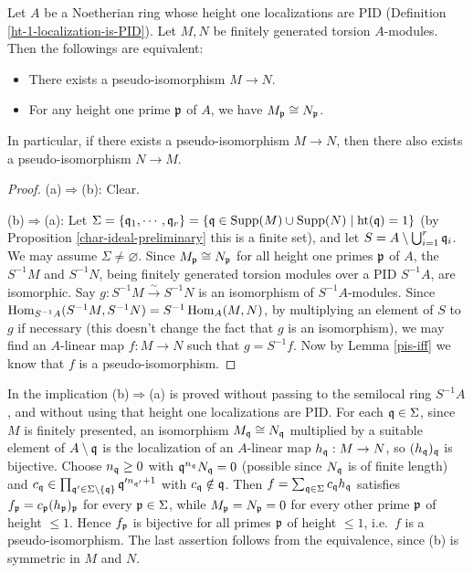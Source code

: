 \begin{prop}
\label{pis-symm}
\leanok
Let $A$ be a Noetherian ring whose height one localizations are PID
(Definition \ref{ht-1-localization-is-PID}).
Let $M,N$ be finitely generated torsion $A$-modules.
Then the followings are equivalent:
\begin{itemize}
\item[(a)]
There exists a pseudo-isomorphism $M\to N$.
\item[(b)]
For any height one prime ${\mathfrak{p}}$ of $A$, we have $M_{\mathfrak{p}}\cong N_{\mathfrak{p}}$.
\end{itemize}
In particular, if there exists a pseudo-isomorphism $M\to N$,
then there also exists a pseudo-isomorphism $N\to M$.
\end{prop}

\begin{proof}
\leanok
(a)$\Rightarrow$(b): Clear.

(b)$\Rightarrow$(a): Let $\Sigma=\{{\mathfrak{q}}_1,\cdots,{\mathfrak{q}}_r\}
=\{{\mathfrak{q}}\in{\mathrm{Supp}}(M)\cup{\mathrm{Supp}}(N)\mid{\mathrm{ht}}({\mathfrak{q}})=1\}$
(by Proposition \ref{char-ideal-preliminary} this is a finite set),
and let $S=A\setminus\bigcup_{i=1}^r{\mathfrak{q}}_i$.
We may assume $\Sigma\neq\varnothing$.
Since $M_{\mathfrak{p}}\cong N_{\mathfrak{p}}$ for all height one primes ${\mathfrak{p}}$ of $A$,
the $S^{-1}M$ and $S^{-1}N$, being finitely generated torsion modules over
a PID $S^{-1}A$, are isomorphic. Say $g:S^{-1}M\xrightarrow\sim S^{-1}N$
is an isomorphism of $S^{-1}A$-modules.
Since $\operatorname{Hom}_{S^{-1}A}(S^{-1}M,S^{-1}N)=S^{-1}\operatorname{Hom}_A(M,N)$,
by multiplying an element of $S$ to $g$ if necessary
(this doesn't change the fact that $g$ is an isomorphism), we may find
an $A$-linear map $f:M\to N$
such that $g=S^{-1}f$.
Now by Lemma \ref{pis-iff} we know that $f$ is a pseudo-isomorphism.
\end{proof}

\begin{remark}
In {\Lean} the implication (b)$\Rightarrow$(a) is proved without passing to the
semilocal ring $S^{-1}A$, and without using that height one localizations are
PID. For each ${\mathfrak{q}}\in\Sigma$, since $M$ is finitely presented, an isomorphism
$M_{\mathfrak{q}}\cong N_{\mathfrak{q}}$ multiplied by a suitable element of $A\setminus{\mathfrak{q}}$ is the
localization of an $A$-linear map $h_{\mathfrak{q}}:M\to N$, so $(h_{\mathfrak{q}})_{\mathfrak{q}}$ is bijective.
Choose $n_{\mathfrak{q}}\geq 0$ with ${\mathfrak{q}}^{n_{\mathfrak{q}}}N_{\mathfrak{q}}=0$ (possible since $N_{\mathfrak{q}}$ is of
finite length) and
$c_{\mathfrak{q}}\in\prod_{{\mathfrak{q}}'\in\Sigma\setminus\{{\mathfrak{q}}\}}{\mathfrak{q}}'^{n_{{\mathfrak{q}}'}+1}$ with
$c_{\mathfrak{q}}\notin{\mathfrak{q}}$. Then $f=\sum_{{\mathfrak{q}}\in\Sigma}c_{\mathfrak{q}} h_{\mathfrak{q}}$ satisfies
$f_{\mathfrak{p}}=c_{\mathfrak{p}}(h_{\mathfrak{p}})_{\mathfrak{p}}$ for every ${\mathfrak{p}}\in\Sigma$, while $M_{\mathfrak{p}}=N_{\mathfrak{p}}=0$ for
every other prime ${\mathfrak{p}}$ of height $\leq 1$. Hence $f_{\mathfrak{p}}$ is bijective for all
primes ${\mathfrak{p}}$ of height $\leq 1$, i.e.~$f$ is a pseudo-isomorphism. The last
assertion follows from the equivalence, since (b) is symmetric in $M$ and $N$.
\end{remark}

